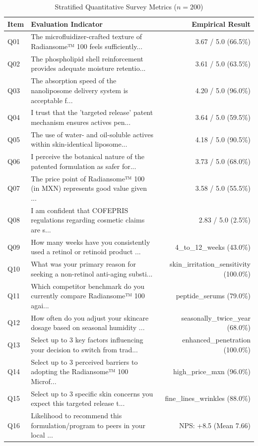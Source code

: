 \documentclass[10pt,twocolumn,a4paper]{article}
\begin{document}
\begin{table}[t]
\centering
\caption{Stratified Quantitative Survey Metrics ($n = 200$)}
\label{tab:metrics}
\small
\begin{tabularx}{\textwidth}{l X r}
\toprule
\textbf{Item} & \textbf{Evaluation Indicator} & \textbf{Empirical Result} \\
\midrule
Q01 & The microfluidizer-crafted texture of Radiansome™ 100 feels sufficiently... & 3.67 / 5.0 (66.5\%) \\
Q02 & The phospholipid shell reinforcement provides adequate moisture retentio... & 3.61 / 5.0 (63.5\%) \\
Q03 & The absorption speed of the nanoliposome delivery system is acceptable f... & 4.20 / 5.0 (96.0\%) \\
Q04 & I trust that the 'targeted release' patent mechanism ensures actives pen... & 3.64 / 5.0 (59.5\%) \\
Q05 & The use of water- and oil-soluble actives within skin-identical liposome... & 4.18 / 5.0 (90.5\%) \\
Q06 & I perceive the botanical nature of the patented formulation as safer for... & 3.73 / 5.0 (68.0\%) \\
Q07 & The price point of Radiansome™ 100 (in MXN) represents good value given ... & 3.58 / 5.0 (55.5\%) \\
Q08 & I am confident that COFEPRIS regulations regarding cosmetic claims are s... & 2.83 / 5.0 (2.5\%) \\
Q09 & How many weeks have you consistently used a retinol or retinoid product ... & 4\_to\_12\_weeks (43.0\%) \\
Q10 & What was your primary reason for seeking a non-retinol anti-aging substi... & skin\_irritation\_sensitivity (100.0\%) \\
Q11 & Which competitor benchmark do you currently compare Radiansome™ 100 agai... & peptide\_serums (79.0\%) \\
Q12 & How often do you adjust your skincare dosage based on seasonal humidity ... & seasonally\_twice\_year (68.0\%) \\
Q13 & Select up to 3 key factors influencing your decision to switch from trad... & enhanced\_penetration (100.0\%) \\
Q14 & Select up to 3 perceived barriers to adopting the Radiansome™ 100 Microf... & high\_price\_mxn (96.0\%) \\
Q15 & Select up to 3 specific skin concerns you expect this targeted release t... & fine\_lines\_wrinkles (88.0\%) \\
Q16 & Likelihood to recommend this formulation/program to peers in your local ... & NPS: +8.5 (Mean 7.66) \\
\bottomrule
\end{tabularx}
\end{table}
\end{document}
